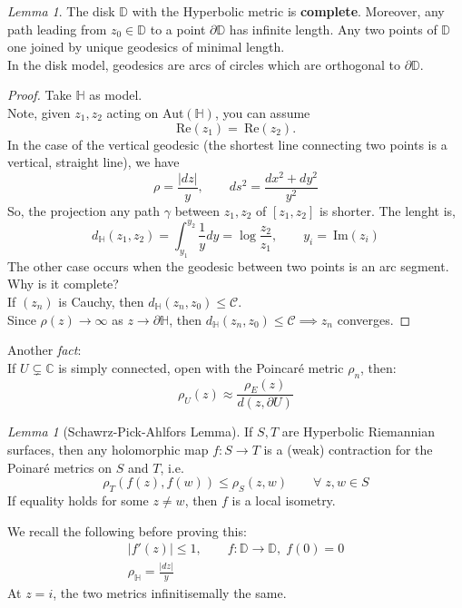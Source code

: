 \documentclass[a4paper, 11pt]{book}
\theoremstyle{definition}
\theoremstyle{remark}
\newtheorem{lemma}[theorem]{Lemma}
\begin{document}
    \begin{lemma}
        The disk $\mathbb{D}$ with the Hyperbolic metric is \textbf{complete}. Moreover, any path leading from $z_0\in\mathbb{D}$ to 
        a point $\partial{\mathbb{D}}$ has infinite length. Any two points of $\mathbb{D}$ one joined by unique geodesics of minimal
        length.\\
        In the disk model, geodesics are arcs of circles which are orthogonal to $\partial{\mathbb{D}}$.
    \end{lemma}
    \begin{proof}
        Take $\mathbb{H}$ as model.\\
        Note, given $z_1,z_2$ acting on Aut$(\mathbb{H})$, you can assume
        \[ \text{Re}(z_1) =\:\text{Re}(z_2). \]
        In the case of the vertical geodesic (the shortest line connecting two points is a vertical, straight line), we have
        \[ \rho = \frac{|dz|}{y},\qquad ds^2 = \frac{dx^2+dy^2}{y^2} \]
        So, the projection any path $\gamma$ between $z_1,z_2$ of $[z_1,z_2]$ is shorter. The lenght is,
        \[ d_{\mathbb{H}}(z_1,z_2) = \int_{y_1}^{y_2} \frac{1}{y}dy = \log{\frac{z_2}{z_1}},\qquad y_i =\:\text{Im}(z_i) \]
        The other case occurs when the geodesic between two points is an arc segment.\\
        Why is it complete?\\
        If $(z_n)$ is Cauchy, then $d_{\mathbb{H}}(z_n,z_0) \leq \mathcal{C}$.\\
        Since $\rho(z)\to\infty$ as $z\to\partial{\mathbb{H}}$, then $d_{\mathbb{H}}(z_n,z_0)\leq\mathcal{C}\implies z_n$ converges.
    \end{proof}

    Another \textit{fact}:\\

    If $U\subsetneq\mathbb{C}$ is simply connected, open with the Poincaré metric $\rho_n$, then:
    \[ \rho_U(z) \approx \frac{\rho_E(z)}{d(z,\partial{U})} \]

    \begin{lemma}[Schawrz-Pick-Ahlfors Lemma]
        If $S,T$ are Hyperbolic Riemannian surfaces, then any holomorphic map $f: S\to T$ is a (weak) contraction for the Poinaré
        metrics on $S$ and $T$, i.e.
        \[ \rho_T(f(z),f(w)) \leq \rho_S(z,w) \qquad \forall\;z,w\in S \]
        If equality holds for some $z\neq w$, then $f$ is a local isometry.
    \end{lemma}

    We recall the following before proving this:
    \begin{align*}
        |f'(z)|\leq 1,\qquad f:\mathbb{D}\to\mathbb{D},\;f(0)=0 \\
        \rho_{\mathbb{H}} = \frac{|dz|}{y}
    \end{align*}
    At $z=i$, the two metrics infinitisemally the same.
\end{document}

